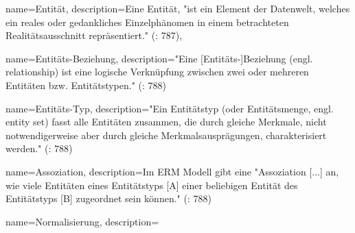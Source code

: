 	{name=Entität,
		description={Eine Entität, "ist ein Element der Datenwelt, welches ein reales oder gedankliches Einzelphänomen in einem betrachteten Realitätsausschnitt repräsentiert." (\cite{gehringWirtschaftsinformatik2022}: 787)},
	}

 	{name=Entitäts-Beziehung,
 		description={"Eine [Entitäts-]Beziehung (engl. relationship) ist eine logische Verknüpfung zwischen zwei oder mehreren Entitäten bzw. Entitätstypen." (\cite{gehringWirtschaftsinformatik2022}: 788)}
	}
	
	{name=Entitäts-Typ,
		description={"Ein Entitätstyp (oder Entitätsmenge, engl. entity set) fasst alle Entitäten zusammen, die durch gleiche Merkmale, nicht notwendigerweise aber durch gleiche Merkmalsausprägungen, charakterisiert werden." (\cite{gehringWirtschaftsinformatik2022}: 788)}
	}
	
{name=Assoziation,
	description={Im ERM Modell gibt eine "Assoziation [...] an, wie viele Entitäten eines Entitätstyps [A] einer beliebigen Entität des Entitätstyps [B] zugeordnet sein können." (\cite{gehringWirtschaftsinformatik2022}: 788)}
}

{name=Normalisierung,
	description={}
}